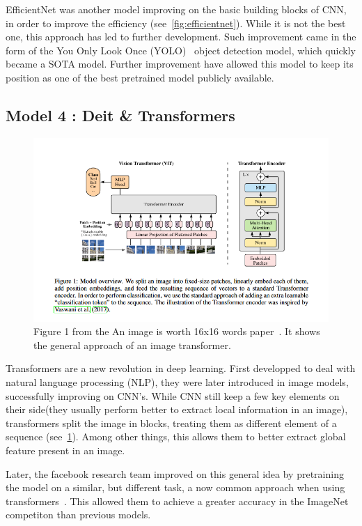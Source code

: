 \documentclass[11pt]{article}
\begin{document}
    EfficientNet was another model improving on the basic building blocks of CNN, in order to improve the efficiency (see~\ref{fig:efficientnet}). While it is
    not the best one, this approach has led to further development. Such improvement came in the form of the You Only Look Once (YOLO)~\cite{yolo} object detection
    model, which quickly became a SOTA model. Further improvement have allowed this model to keep its position as one of the best pretrained model publicly available.

    \subsection{Model 4 : Deit \& Transformers}


        \begin{figure}[H]

             \centering
             \includegraphics[width=0.8 \textwidth]{plots/transformer}
             \caption{Figure 1 from the An image is worth 16x16 words paper~\cite{image16x16}. It shows the general approach of an image transformer.}
             \label{fig:transformer}

        \end{figure}

        Transformers \cite{image16x16} are a new revolution in deep learning. First developped to deal with natural language processing (NLP),
        they were later introduced in image models, successfully improving on CNN's. While CNN still keep a few key
        elements on their side(they usually perform better to extract local information in an image), transformers split the image in blocks,
        treating them as different element of a sequence (see~\ref{fig:transformer}). Among other things, this allows them to better extract global feature present in an image.

        Later, the facebook research team improved on this general idea by pretraining the model on a similar, but different task, a now
        common approach when using transformers~\cite{deit}. This allowed them to achieve a greater accuracy in the ImageNet competiton than previous models.
\end{document}
